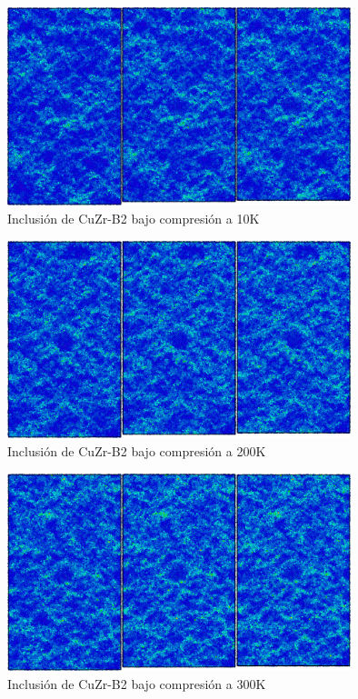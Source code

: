\begin{figure}[htp]
\centering
\includegraphics[width=10cm]{../ResumenImagenes/Figures/NanoParticles/Snapshots/B2SphereCompression_10K_Snapshots.png}
\caption[Inclusión de CuZr-B2 bajo compresión a 10K]{Inclusión de CuZr-B2 bajo compresión a 10K}
\label{C4:fg:snapshot_comp_B2_10K}
\end{figure}

\begin{figure}[htp]
\centering
\includegraphics[width=10cm]{../ResumenImagenes/Figures/NanoParticles/Snapshots/B2SphereCompression_200K_Snapshots.png}
\caption[Inclusión de CuZr-B2 bajo compresión a 200K]{Inclusión de CuZr-B2 bajo compresión a 200K}
\label{C4:fg:snapshot_comp_B2_200K}
\end{figure}

\begin{figure}[htp]
\centering
\includegraphics[width=10cm]{../ResumenImagenes/Figures/NanoParticles/Snapshots/B2SphereCompression_300K_Snapshots.png}
\caption[Inclusión de CuZr-B2 bajo compresión a 300K]{Inclusión de CuZr-B2 bajo compresión a 300K}
\label{C4:fg:snapshot_comp_B2_300K}
\end{figure}

